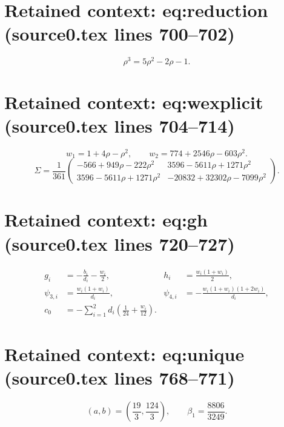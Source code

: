 \documentclass[10pt,a4paper]{amsart}
\theoremstyle{plain}
\theoremstyle{remark}
\begin{document}
\section*{Retained context: eq:reduction (source0.tex lines 700--702)}

\begin{equation}\label{eq:reduction}
 \rho^3=5\rho^2-2\rho-1.
\end{equation}


\section*{Retained context: eq:wexplicit (source0.tex lines 704--714)}

\begin{equation}\label{eq:wexplicit}
 w_1=1+4\rho-\rho^2,\qquad
 w_2=774+2546\rho-603\rho^2.
\end{equation}
\begin{equation}\label{eq:Cexplicit}
 \Sigma=\frac1{361}
 \begin{pmatrix}
 -566+949\rho-222\rho^2&3596-5611\rho+1271\rho^2\\
 3596-5611\rho+1271\rho^2&-20832+32302\rho-7099\rho^2
 \end{pmatrix}.
\end{equation}


\section*{Retained context: eq:gh (source0.tex lines 720--727)}

\begin{align}
 g_i&=-\frac{b_i}{d_i}-\frac{w_i}{2},&
 h_i&=\frac{w_i(1+w_i)}2,\label{eq:gh}\\
 \psi_{3,i}&=\frac{w_i(1+w_i)}{d_i},&
 \psi_{4,i}&=-\frac{w_i(1+w_i)(1+2w_i)}{d_i},\label{eq:TV}\\
 c_0&=-\sum_{i=1}^2d_i\left(\frac1{24}+\frac{w_i}{12}\right).
 \label{eq:c0}
\end{align}


\section*{Retained context: eq:unique (source0.tex lines 768--771)}

\begin{equation}\label{eq:unique}
 (a,b)=\left(\frac{19}{3},\frac{124}{3}\right),
 \qquad \beta_1=\frac{8806}{3249}.
\end{equation}
\end{document}
